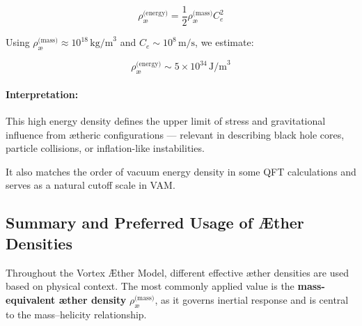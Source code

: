 \documentclass[preprint]{revtex4-2}
\begin{document}
                \[
                \rho_{\text{\ae}}^{\text{(energy)}} = \frac{1}{2} \rho_{\text{\ae}}^{\text{(mass)}} C_e^2
                \]
        
                Using \( \rho_{\text{\ae}}^{\text{(mass)}} \approx 10^{18} \, \text{kg/m}^3 \) and \( C_e \sim 10^8 \, \text{m/s} \), we estimate:
        
                \[
                \rho_{\text{\ae}}^{\text{(energy)}} \sim 5 \times 10^{34} \, \text{J/m}^3
                \]
        
                \paragraph{Interpretation:}
                This high energy density defines the upper limit of stress and gravitational influence from ætheric configurations — relevant in describing black hole cores, particle collisions, or inflation-like instabilities.
        
                It also matches the order of vacuum energy density in some QFT calculations and serves as a natural cutoff scale in VAM.
        
                \subsection*{Summary and Preferred Usage of Æther Densities}
        
                Throughout the Vortex \AE{}ther Model, different effective æther densities are used based on physical context. The most commonly applied value is the \textbf{mass-equivalent æther density} \( \rho_{\text{\ae}}^{\text{(mass)}} \), as it governs inertial response and is central to the mass–helicity relationship.
        
\end{document}
